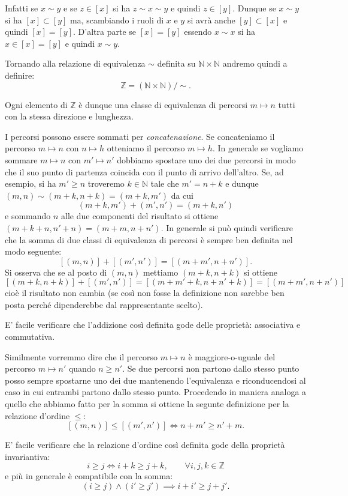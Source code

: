 \documentclass[italian,a4paper,hidelinks,headinclude]{scrartcl}
\newcommand{\NN}{{\mathbb N}}
\newcommand{\ZZ}{{\mathbb Z}}
\begin{document}
Infatti se $x \sim y$ e se $z\in [x]$ si ha $z\sim x \sim y$ e quindi $z\in
[y]$.
Dunque se $x\sim y$ si ha $[x]\subset [y]$ ma, scambiando i ruoli di $x$ e $y$
si avrà anche $[y]\subset [x]$ e quindi $[x]=[y]$. D'altra parte se $[x]=[y]$
essendo $x\sim x$ si ha $x\in [x] = [y]$ e quindi $x\sim y$.

Tornando alla relazione di equivalenza $\sim$ definita su $\NN\times \NN$
andremo quindi a definire:
\[
  \ZZ = (\NN \times \NN)/\sim.
\]

Ogni elemento di $\ZZ$ è dunque una classe di equivalenza di percorsi
$m\mapsto n$ tutti con la stessa direzione e lunghezza.

I percorsi possono essere sommati per \emph{concatenazione}. Se concateniamo
il percorso $m\mapsto n$ con $n\mapsto h$ otteniamo il percorso $m\mapsto h$.
In generale se vogliamo sommare $m\mapsto n$ con $m'\mapsto n'$
dobbiamo spostare uno dei due percorsi in modo che il suo punto di partenza coincida
con il punto di arrivo dell'altro. Se, ad esempio, si ha $m'\ge n$ troveremo $k\in \NN$
tale che $m'=n+k$ e dunque $(m,n)\sim(m+k,n+k)=(m+k,m')$ da cui
\[
  (m+k,m') + (m',n') = (m+k,n')
\]
e sommando $n$ alle due componenti del risultato si ottiene
$(m+k+n,n'+n) = (m+m,n+n')$.
In generale si può quindi verificare che la somma di due classi di equivalenza
di percorsi è sempre ben definita nel modo seguente:
\[
  [(m,n)] + [(m',n')] = [(m+m',n+n')].
\]
Si osserva che se al posto di $(m,n)$ mettiamo $(m+k,n+k)$ si ottiene
\[
  [(m+k,n+k)] + [(m',n')] = [(m+m'+k,n+n'+k)] = [(m+m',n+n')]
\]
cioè il risultato non cambia (se così non fosse la definizione non sarebbe
ben posta perché dipenderebbe dal rappresentante scelto).

E' facile verificare che l'addizione così definita gode delle proprietà:
associativa e commutativa.

Similmente vorremmo dire che il percorso $m\mapsto n$ è maggiore-o-uguale
del percorso $m\mapsto n'$ quando $n\ge n'$. Se due percorsi non partono
dallo stesso punto posso sempre spostarne uno dei due mantenendo l'equivalenza e
riconducendosi al caso in cui entrambi partono dallo stesso punto.
Procedendo in maniera analoga a quello che abbiamo fatto per la somma
si ottiene la segunte definizione per la relazione d'ordine $\le$:
\[
  [(m,n)] \le [(m',n')] \iff n+m' \ge n' + m.
\]

E' facile verificare che la relazione d'ordine così definita
gode della proprietà invariantiva:
\[
  i \ge j \iff i+k \ge j+k, \qquad \forall i,j,k\in \ZZ
\]
e più in generale è compatibile con la somma:
\[
 (i\ge j) \land (i'\ge j') \implies i+i' \ge j+j'.
\]
\end{document}
